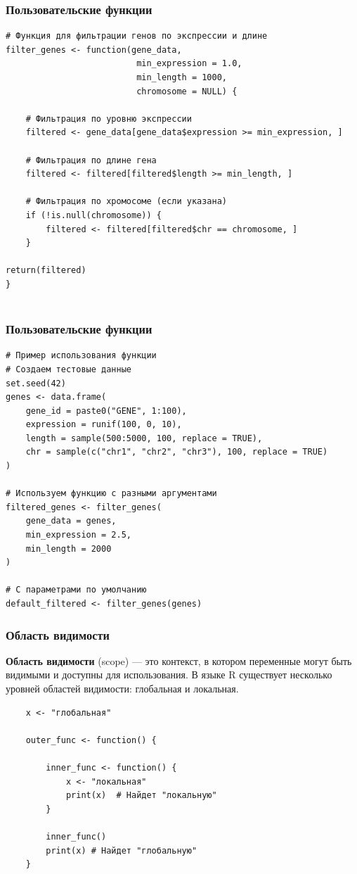 \documentclass[11pt,a4paper]{beamer}
\begin{document}
	
	
	
	
	\begin{frame}[fragile]
		\frametitle{Пользовательские функции}
		{\fontsize{8}{9}\selectfont
		\begin{verbatim}
# Функция для фильтрации генов по экспрессии и длине
filter_genes <- function(gene_data, 
			              min_expression = 1.0, 
			              min_length = 1000, 
			              chromosome = NULL) {
				
    # Фильтрация по уровню экспрессии
    filtered <- gene_data[gene_data$expression >= min_expression, ]
				
    # Фильтрация по длине гена
    filtered <- filtered[filtered$length >= min_length, ]
				
    # Фильтрация по хромосоме (если указана)
    if (!is.null(chromosome)) {
        filtered <- filtered[filtered$chr == chromosome, ]
    }
				
return(filtered)
}
			
		\end{verbatim}
	}
	\end{frame}
	
	
	
	\begin{frame}[fragile]
		\frametitle{Пользовательские функции}
		{\fontsize{8}{9}\selectfont
			\begin{verbatim}
# Пример использования функции
# Создаем тестовые данные
set.seed(42)
genes <- data.frame(
    gene_id = paste0("GENE", 1:100),
    expression = runif(100, 0, 10),
    length = sample(500:5000, 100, replace = TRUE),
    chr = sample(c("chr1", "chr2", "chr3"), 100, replace = TRUE)
)
				
# Используем функцию с разными аргументами
filtered_genes <- filter_genes(
    gene_data = genes,
    min_expression = 2.5,
    min_length = 2000
)
				
# С параметрами по умолчанию
default_filtered <- filter_genes(genes)
			\end{verbatim}
		}
	\end{frame}
	
	

	
	
	\begin{frame}[fragile]
		\frametitle{Область видимости}
\textbf{Область видимости} (scope) — это контекст, в котором переменные могут быть видимыми и доступны для использования. В языке R существует несколько уровней областей видимости: глобальная и локальная.
{\fontsize{10}{10}\selectfont
		\begin{verbatim}
    x <- "глобальная"

    outer_func <- function() {
	
        inner_func <- function() {
            x <- "локальная"
            print(x)  # Найдет "локальную"
        }
	
        inner_func()
        print(x) # Найдет "глобальную"
    }
		\end{verbatim}
	}
	\end{frame}
	
\end{document}

